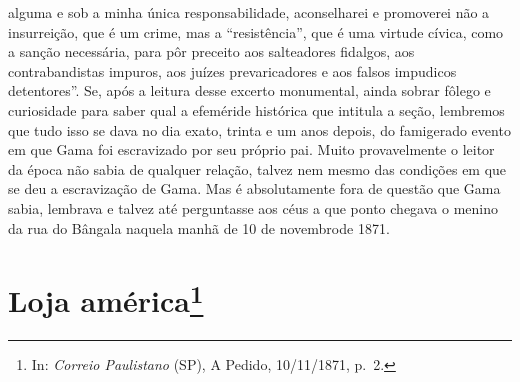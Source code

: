 {\begin{didascalia}
{alguma e sob a minha única responsabilidade, aconselharei e promoverei
não a insurreição, que é um crime, mas a ``resistência'', que é uma
virtude cívica, como a sanção necessária, para pôr preceito aos
salteadores fidalgos, aos contrabandistas impuros, aos juízes
prevaricadores e aos falsos impudicos detentores''. Se, após a leitura
desse excerto monumental, ainda sobrar fôlego e curiosidade para saber
qual a efeméride histórica que intitula a seção, lembremos que tudo isso
se dava no dia exato, trinta e um anos depois, do famigerado evento em
que Gama foi escravizado por seu próprio pai. Muito provavelmente o
leitor da época não sabia de qualquer relação, talvez nem mesmo das
condições em que se deu a escravização de Gama. Mas é absolutamente fora
de questão que Gama sabia, lembrava e talvez até perguntasse aos céus a
que ponto chegava o menino da rua do Bângala naquela manhã de 10 de
novembrode 1871.}
\end{didascalia}

\chapter{Loja américa\footnote{ In: \emph{Correio Paulistano} (SP), A Pedido, 10/11/1871,
  p.~2.}} %

}
